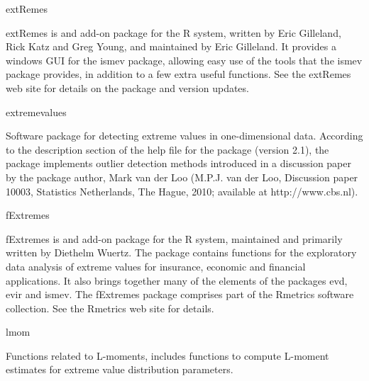 \begin{frame}

extRemes

extRemes is and add-on package for the R system, written by Eric Gilleland, Rick Katz and Greg Young, and maintained by Eric Gilleland. It provides a windows GUI for the ismev package, allowing easy use of the tools that the ismev package provides, in addition to a few extra useful functions. See the extRemes web site for details on the package and version updates.

extremevalues

Software package for detecting extreme values in one-dimensional data. According to the description section of the help file for the package (version 2.1), the package implements outlier detection methods introduced in a discussion paper by the package author, Mark van der Loo (M.P.J. van der Loo, Discussion paper 10003, Statistics Netherlands, The Hague, 2010; available at http://www.cbs.nl).

fExtremes

fExtremes is and add-on package for the R system, maintained and primarily written by Diethelm Wuertz. The package contains functions for the exploratory data analysis of extreme values for insurance, economic and financial applications. It also brings together many of the elements of the packages evd, evir and ismev. The fExtremes package comprises part of the Rmetrics software collection. See the Rmetrics web site for details.

lmom

Functions related to L-moments, includes functions to compute L-moment estimates for extreme value distribution parameters.

\end{frame}
